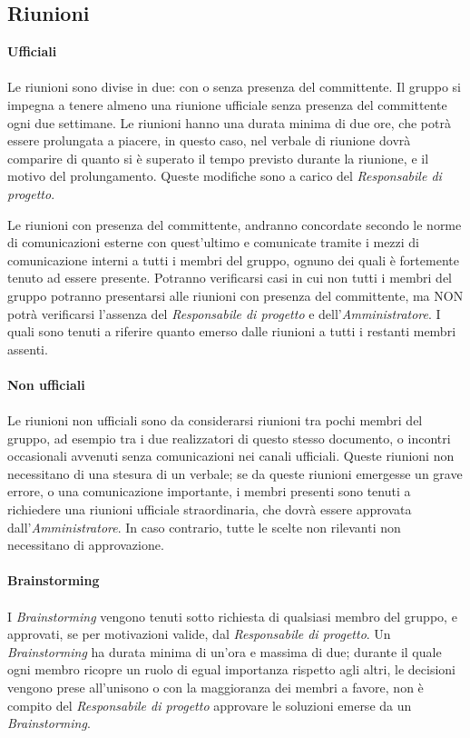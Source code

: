 \documentclass[a4paper]{report}
\begin{document}
	\subsection{Riunioni}
	\textbf{Ufficiali} \\ \\
		Le riunioni sono divise in due: con o senza presenza del committente. Il gruppo si impegna a tenere almeno una riunione
		ufficiale senza presenza del committente ogni due settimane. Le riunioni hanno una durata minima di due ore, che potrà 
		essere prolungata a piacere, in questo caso, nel verbale di riunione dovrà comparire di quanto si è superato il tempo
		previsto durante la riunione, e il motivo del prolungamento. Queste modifiche sono a carico del \emph{Responsabile di progetto}.
		
		Le riunioni con presenza del committente, andranno concordate secondo le norme di comunicazioni esterne con quest'ultimo
		e comunicate tramite i mezzi di comunicazione interni a tutti i membri del gruppo, ognuno dei quali è fortemente tenuto ad
		essere presente. Potranno verificarsi casi in cui non tutti i membri del gruppo potranno presentarsi alle riunioni con 
		presenza del committente, ma NON potrà verificarsi l'assenza del \emph{Responsabile di progetto} e dell'\emph{Amministratore}.
		I quali sono tenuti a riferire quanto emerso dalle riunioni a tutti i restanti membri assenti. \\ \\
	\textbf{Non ufficiali} \\ \\
		Le riunioni non ufficiali sono da considerarsi riunioni tra pochi membri del gruppo, ad esempio tra i due realizzatori di questo
		stesso documento, o incontri occasionali avvenuti senza comunicazioni nei canali ufficiali. Queste riunioni non necessitano di 
		una stesura di un verbale; se da queste riunioni emergesse un grave errore, o una comunicazione importante, i membri presenti
		sono tenuti a richiedere una riunioni ufficiale straordinaria, che dovrà essere approvata dall'\emph{Amministratore}. In caso 
		contrario, tutte le scelte non rilevanti non necessitano di approvazione. \\ \\
	\textbf{Brainstorming} \\ \\
		I \emph{Brainstorming} vengono tenuti sotto richiesta di qualsiasi membro del gruppo, e approvati, se per motivazioni
		valide, dal \emph{Responsabile di progetto}. Un \emph{Brainstorming} ha durata minima di un'ora e massima di due; durante il quale
		ogni membro ricopre un ruolo di egual importanza rispetto agli altri, le decisioni vengono prese all'unisono o con la maggioranza 
		dei membri a favore, non è compito del \emph{Responsabile di progetto} approvare le soluzioni emerse da un \emph{Brainstorming}.
		
\end{document}
